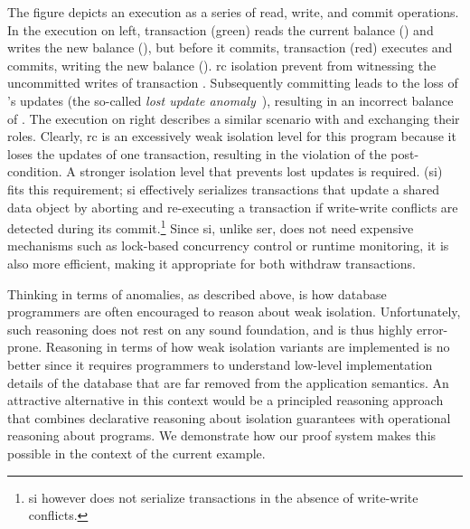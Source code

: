 The figure depicts an execution as a series of read, write, and commit
operations. In the execution on left, transaction  (green)
reads the current balance () and writes the new balance
(), but before it commits, transaction  (red) executes
and commits, writing the new balance (). {\sc rc} isolation
prevent  from witnessing the uncommitted writes of transaction
.  Subsequently committing  leads to the loss of
's updates (the so-called \emph{lost update
anomaly}~\cite{berenson}), resulting in an incorrect balance of
. The execution on right describes a similar scenario with
 and  exchanging their roles.  Clearly, {\sc rc} is an
excessively weak isolation level for this program because it loses the
updates of one transaction, resulting in the violation of the
post-condition.  A stronger isolation level that prevents lost updates
is required.  ({\sc si})~\cite{berenson} fits
this requirement; {\sc si} effectively serializes transactions that
update a shared data object by aborting and re-executing a transaction
if write-write conflicts are detected during its commit.\footnote{{\sc
si} however does not serialize transactions in the absence of
write-write conflicts.} Since {\sc si}, unlike {\sc ser}, does not
need expensive mechanisms such as lock-based concurrency control or
runtime monitoring, it is also more efficient, making it appropriate
for both withdraw transactions.

Thinking in terms of anomalies, as described above, is how database
programmers are often encouraged to reason about weak isolation.
Unfortunately, such reasoning does not rest on any sound foundation,
and is thus highly error-prone. Reasoning in terms of how weak
isolation variants are implemented is no better since it requires
programmers to understand low-level implementation details of the
database that are far removed from the application semantics. An
attractive  alternative in this context would be a principled
reasoning approach that combines declarative reasoning about isolation
guarantees with operational reasoning about programs. We demonstrate
how our proof system makes this possible in the context of the current
example.

